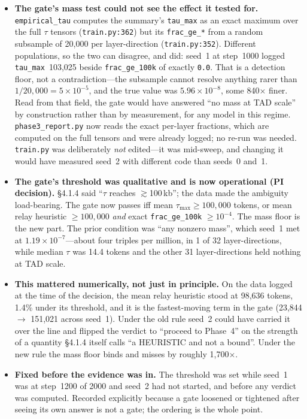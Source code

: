 \documentclass[11pt,a4paper]{article}
\newcommand{\code}[1]{\texttt{\small #1}}
\newcommand{\warn}[1]{\textcolor{warncol}{\textbf{#1}}}
\begin{document}
\begin{itemize}
\item \warn{The gate's mass test could not see the effect it tested for.}
\code{empirical\_tau} computes the summary's \code{tau\_max} as an exact maximum
over the full $\tau$ tensors (\code{train.py:362}) but its \code{frac\_ge\_*}
from a random subsample of 20{,}000 per layer-direction
(\code{train.py:352}). Different populations, so the two can disagree, and did:
seed~1 at step~1000 logged \code{tau\_max}~103{,}025 beside
\code{frac\_ge\_100k} of exactly \code{0.0}. That is a detection floor, not a
contradiction---the subsample cannot resolve anything rarer than
$1/20{,}000 = 5\times10^{-5}$, and the true value was $5.96\times10^{-8}$, some
840$\times$ finer. Read from that field, the gate would have answered ``no mass
at TAD scale'' by construction rather than by measurement, for any model in this
regime. \code{phase3\_report.py} now reads the exact per-layer fractions, which
are computed on the full tensors and were already logged; no re-run was needed.
\code{train.py} was deliberately \emph{not} edited---it was mid-sweep, and
changing it would have measured seed~2 with different code than seeds~0 and~1.
\item \textbf{The gate's threshold was qualitative and is now operational (PI
decision).} \S4.1.4 said ``$\tau$ reaches $\gtrsim$100\,kb''; the data made the
ambiguity load-bearing. The gate now passes iff mean $\tau_{\max} \ge 100{,}000$
tokens, or mean relay heuristic $\ge 100{,}000$ \emph{and} exact
\code{frac\_ge\_100k} $\ge 10^{-4}$. The mass floor is the new part. The prior
condition was ``any nonzero mass'', which seed~1 met at $1.19\times10^{-7}$---about
four triples per million, in 1 of 32 layer-directions, while median $\tau$ was
14.4 tokens and the other 31 layer-directions held nothing at TAD scale.
\item \warn{This mattered numerically, not just in principle.} On the data
logged at the time of the decision, the mean relay heuristic stood at 98{,}636
tokens, 1.4\% under its threshold, and it is the fastest-moving term in the gate
(23{,}844 $\rightarrow$ 151{,}021 across seed~1). Under the old rule seed~2
could have carried it over the line and flipped the verdict to ``proceed to
Phase~4'' on the strength of a quantity \S4.1.4 itself calls ``a HEURISTIC and
not a bound''. Under the new rule the mass floor binds and misses by roughly
1{,}700$\times$.
\item \textbf{Fixed before the evidence was in.} The threshold was set while
seed~1 was at step~1200 of 2000 and seed~2 had not started, and before any
verdict was computed. Recorded explicitly because a gate loosened or tightened
after seeing its own answer is not a gate; the ordering is the whole point.
\end{itemize}
\end{document}
